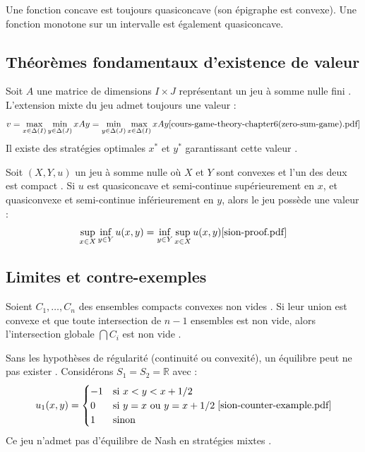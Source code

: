 \begin{remark}
Une fonction concave est toujours quasiconcave (son épigraphe est convexe). Une fonction monotone sur un intervalle est également quasiconcave.
\end{remark}

\subsection{Théorèmes fondamentaux d'existence de valeur}

\begin{theorem}
Soit $A$ une matrice de dimensions $I \times J$ représentant un jeu à somme nulle fini \cite{cours-game-theory-chapter6(zero-sum-game).pdf}. L'extension mixte du jeu admet toujours une valeur :
$$v = \max_{x \in \Delta(I)} \min_{y \in \Delta(J)} xAy = \min_{y \in \Delta(J)} \max_{x \in \Delta(I)} xAy \cite{cours-game-theory-chapter6(zero-sum-game).pdf}$$
Il existe des stratégies optimales $x^*$ et $y^*$ garantissant cette valeur \cite{cours-game-theory-chapter6(zero-sum-game).pdf}.
\end{theorem}

\begin{theorem}
Soit $(X, Y, u)$ un jeu à somme nulle où $X$ et $Y$ sont convexes et l'un des deux est compact \cite{sion-proof.pdf}. Si $u$ est quasiconcave et semi-continue supérieurement en $x$, et quasiconvexe et semi-continue inférieurement en $y$, alors le jeu possède une valeur \cite{sion-proof.pdf} :
$$\sup_{x \in X} \inf_{y \in Y} u(x, y) = \inf_{y \in Y} \sup_{x \in X} u(x, y) \cite{sion-proof.pdf}$$
\end{theorem}

\subsection{Limites et contre-exemples}

\begin{lemma}
Soient $C_1, \dots, C_n$ des ensembles compacts convexes non vides \cite{sion-counter-example.pdf}. Si leur union est convexe et que toute intersection de $n-1$ ensembles est non vide, alors l'intersection globale $\bigcap C_i$ est non vide \cite{sion-counter-example.pdf}.
\end{lemma}

\begin{example}
Sans les hypothèses de régularité (continuité ou convexité), un équilibre peut ne pas exister \cite{sion-counter-example.pdf}.
Considérons $S_1 = S_2 = \mathbb{R}$ avec :
$$u_1(x, y) = \begin{cases} -1 & \text{si } x < y < x + 1/2 \\ 0 & \text{si } y = x \text{ ou } y = x + 1/2 \\ 1 & \text{sinon} \end{cases} \cite{sion-counter-example.pdf}$$
Ce jeu n'admet pas d'équilibre de Nash en stratégies mixtes \cite{sion-counter-example.pdf}.
\end{example}

